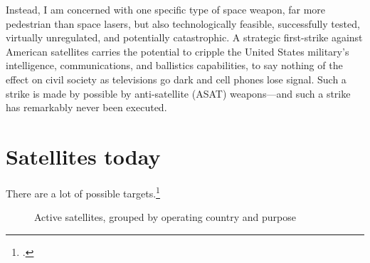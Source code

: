\documentclass{report}
\begin{document}
Instead, I am concerned with one specific type of space weapon, far more pedestrian than space lasers, but also technologically feasible, successfully tested, virtually unregulated, and potentially catastrophic. A strategic first-strike against American satellites carries the potential to cripple the United States military's intelligence, communications, and ballistics capabilities, to say nothing of the effect on civil society as televisions go dark and cell phones lose signal. Such a strike is made by possible by anti-satellite (ASAT) weapons---and such a strike has remarkably never been executed.


\section{Satellites today}
There are a lot of possible targets.\footcite[A few satellites are listed as dual-purpose (i.e. Government/Military), and those are counted twice, once for each purpose. For instance, the data shows that the US is currently operating 830 satellites, while adding up the bars in this chart would give you 966. I made this choice to emphasize the dependency of various social systems on the existing satellite infrastructure.]{union_of_concerned_scientists_ucs_2018}


\begin{figure}[ht]
  \centering
  
  \label{country_sats}
  \caption{Active satellites, grouped by operating country and purpose}
\end{figure}

\newpage
\printbibliography[heading=subbibliography]
\end{document}
